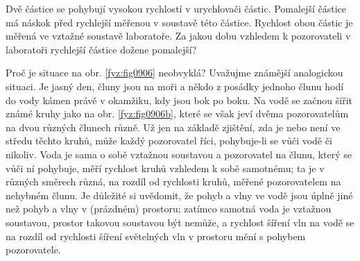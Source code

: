 \begin{mdframed}[style=mdexam]
  \begin{example}\label{fyz:fey_exam018}
    Dvě částice se pohybují vysokou rychlostí v urychlovači částic. Pomalejší částice má náskok před
    rychlejší měřenou v soustavě této částice. Rychlost obou částic je měřená ve vztažné soustavě
    laboratoře. Za jakou dobu vzhledem k pozorovateli v laboratoři rychlejší částice dožene
    pomalejší?


    Proč je situace na obr. \ref{fyz:fig0906} neobvyklá? Uvažujme známější analogickou situaci. Je
    jasný den, čluny jsou na moři a někdo z posádky jednoho člunu hodí do vody kámen právě v
    okamžiku, kdy jsou bok po boku. Na vodě se začnou šířit známé kruhy jako na obr.
    \ref{fyz:fig0906b}, které se však jeví dvěma pozorovatelům na dvou různých člunech různě. Už jen
    na základě zjištění, zda je nebo není ve středu těchto kruhů, může každý pozorovatel říci,
    pohybuje-li se vůči vodě či nikoliv. Voda je sama o sobě vztažnou soustavou a pozorovatel na
    člunu, který se vůči ní pohybuje, měří rychlost kruhů vzhledem k sobě samotnému; ta je v různých
    směrech různá, na rozdíl od rychlosti kruhů, měřené pozorovatelem na nehybném člunu. Je důležité
    si uvědomit, že pohyb a vlny ve vodě jsou úplně jiné než pohyb a vlny v (prázdném) prostoru;
    zatímco samotná voda je vztažnou soustavou, prostor takovou soustavou být nemůže, a rychlost
    šíření vln na vodě se na rozdíl od rychlosti šíření světelných vln v prostoru mění s pohybem
    pozorovatele.

    {\centering
    \captionsetup{type=figure}
    \par}
    \vspace{1em}

  \end{example}
\end{mdframed}